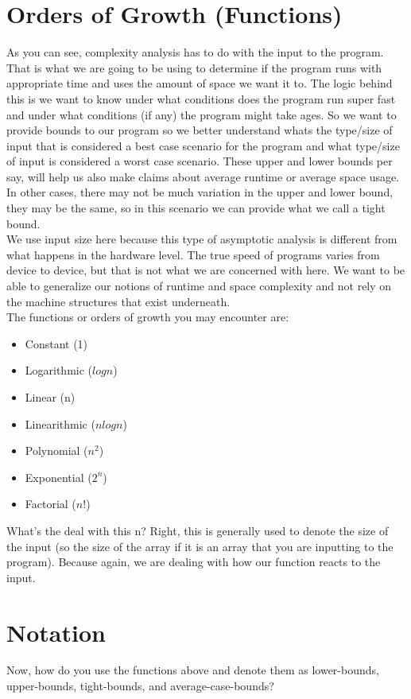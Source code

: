 \documentclass{article}
\begin{document}
\section{Orders of Growth (Functions)}
As you can see, complexity analysis has to do with the input to the program. That is what we are going to be using to determine if the program runs with appropriate time and uses the amount of space we want it to. The logic behind this is we want to know under what conditions does the program run super fast and under what conditions (if any) the program might take ages. So we want to provide bounds to our program so we better understand whats the type/size of input that is considered a best case scenario for the program and what type/size of input is considered a worst case scenario. These upper and lower bounds per say, will help us also make claims about average runtime or average space usage. In other cases, there may not be much variation in the upper and lower bound, they may be the same, so in this scenario we can provide what we call a tight bound. \\
We use input size here because this type of asymptotic analysis is different from what happens in the hardware level. The true speed of programs varies from device to device, but that is not what we are concerned with here. We want to be able to generalize our notions of runtime and space complexity and not rely on the machine structures that exist underneath. \\
The functions or orders of growth you may encounter are: 
\begin{itemize}
    \item Constant (1)
    \item Logarithmic ($logn$)
    \item Linear (n)
    \item Linearithmic ($nlogn$)
    \item Polynomial ($n^2$)
    \item Exponential ($2^n$)
    \item Factorial ($n!$)
\end{itemize}
What's the deal with this n? Right, this is generally used to denote the size of the input (so the size of the array if it is an array that you are inputting to the program). Because again, we are dealing with how our function reacts to the input. 
\newpage
\section{Notation}
Now, how do you use the functions above and denote them as lower-bounds, upper-bounds, tight-bounds, and average-case-bounds?
\end{document}
